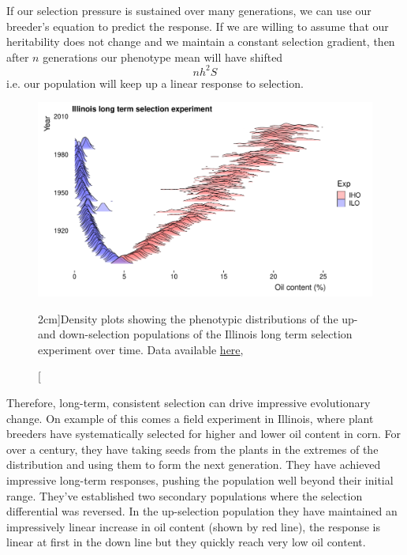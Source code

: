 If our selection pressure is sustained over many generations, we can
use our breeder's equation to predict the response. If we are willing
to assume that our heritability does not change and we maintain a constant selection
gradient, then after $n$ generations our phenotype mean will have
shifted 
\begin{equation}
n h^2 S
\end{equation}
i.e. our population will keep up a linear response to selection.
 \begin{figure}
 \begin{center}
   \includegraphics[width=\textwidth]{Journal_figs/Quant_gen/Illinois_long_term_selection_corn/Illinois_LTS_ggridges_distribution.pdf}\end{center}
 \caption[][2cm]{Density plots showing the phenotypic distributions of the
   up- and down-selection populations of the Illinois long term
   selection experiment over time. Data available
   \href{https://www.ideals.illinois.edu/handle/2142/3525}{here}, }\label{Fig:Illinois_LTS_dists}
 \end{figure}
Therefore, long-term, consistent selection can drive impressive
evolutionary change. On example of this comes a field experiment
in Illinois, where plant breeders have systematically selected for
higher and lower oil content in corn. For over a century, they have taking seeds from the plants
in the extremes of the distribution and using them to form the next
generation. They have achieved impressive long-term responses, pushing
the population well beyond their initial range. They've established
two secondary populations where the selection differential was reversed. In the up-selection population they have maintained an
impressively linear increase in oil content (shown by red line), the
response is linear at first in the down line but they quickly reach
very low oil content.

